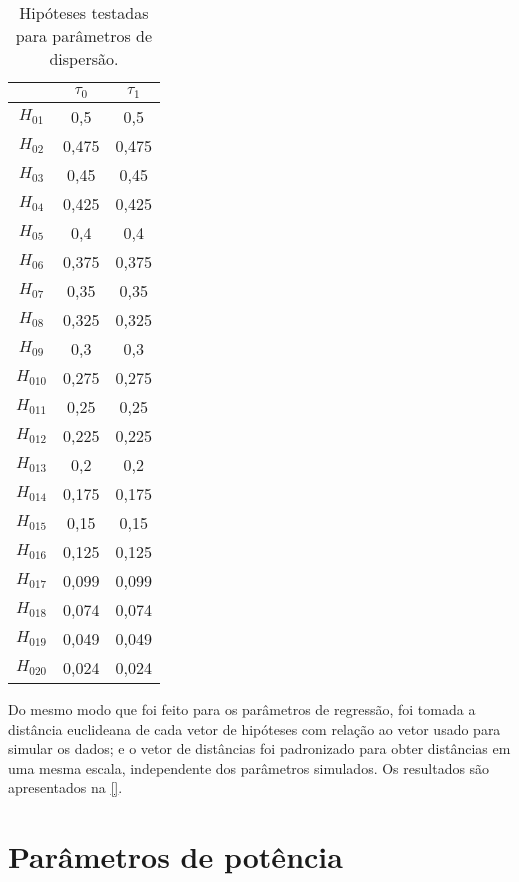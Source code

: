 \begin{table}[H]
\centering
\begin{tabular}{ccc}
\hline
          & $\tau_0$ & $\tau_1$ \\ \hline
$H_{01}$  & 0,5      & 0,5      \\
$H_{02}$  & 0,475    & 0,475    \\
$H_{03}$  & 0,45     & 0,45     \\
$H_{04}$  & 0,425    & 0,425    \\
$H_{05}$  & 0,4      & 0,4      \\
$H_{06}$  & 0,375    & 0,375    \\
$H_{07}$  & 0,35     & 0,35     \\
$H_{08}$  & 0,325    & 0,325    \\
$H_{09}$  & 0,3      & 0,3      \\
$H_{010}$ & 0,275    & 0,275    \\
$H_{011}$ & 0,25     & 0,25     \\
$H_{012}$ & 0,225    & 0,225    \\
$H_{013}$ & 0,2      & 0,2      \\
$H_{014}$ & 0,175    & 0,175    \\
$H_{015}$ & 0,15     & 0,15     \\
$H_{016}$ & 0,125    & 0,125    \\
$H_{017}$ & 0,099    & 0,099    \\
$H_{018}$ & 0,074    & 0,074    \\
$H_{019}$ & 0,049    & 0,049    \\
$H_{020}$ & 0,024    & 0,024    \\ \hline
\end{tabular}
\caption{Hipóteses testadas para parâmetros de dispersão.}
\label{tab:th_taus}
\end{table}

Do mesmo modo que foi feito para os parâmetros de regressão, foi tomada a distância euclideana de cada vetor de hipóteses com relação ao vetor usado para simular os dados; e o vetor de distâncias foi padronizado para obter distâncias em uma mesma escala, independente dos parâmetros simulados. Os resultados são apresentados na \autoref{}.

\section{Parâmetros de potência}

